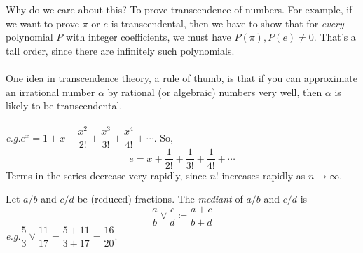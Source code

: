 Why do we care about this? To prove transcendence of numbers. For example, if we want to prove $\pi$ or $e$ is transcendental, then we have to show that for \emph{every} polynomial $P$ with integer coefficients, we must have $P(\pi),P(e) \neq 0$. That's a tall order, since there are infinitely such polynomials.\\
\\
One idea in transcendence theory, a rule of thumb, is that if you can approximate an irrational number $\alpha$ by rational (or algebraic) numbers very well, then $\alpha$ is likely to be transcendental.\\
\\
\emph{e.g.}\quad $e^x = 1 + x + \dfrac{x^2}{2!} + \dfrac{x^3}{3!} + \dfrac{x^4}{4!} + \cdots$. So,\\[-0.5em]
\[e = x + \dfrac{1}{2!} + \dfrac{1}{3!} + \dfrac{1}{4!} + \cdots\]
Terms in the series decrease very rapidly, since $n!$ increases rapidly as $n\to \infty$.
\vspace*{2em}

\begin{definition}
Let $a/b$ and $c/d$ be (reduced) fractions. The \emph{mediant} of $a/b$ and $c/d$ is
\[\dfrac{a}{b} \vee \dfrac{c}{d} \coloneqq \dfrac{a+c}{b+d}\]
\emph{e.g.}\quad $\dfrac{5}{3} \vee \dfrac{11}{17} = \dfrac{5+11}{3 + 17} = \dfrac{16}{20}$.
\end{definition}

\vspace*{1em}

